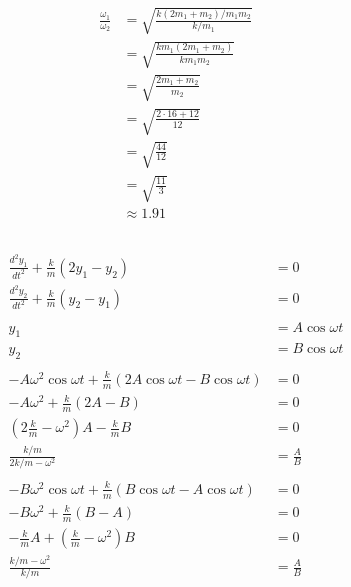 \documentclass{article}
\begin{document}
\begin{enumerate}
        \begin{align*}
          \frac{\omega_1}{\omega_2} & = \sqrt{\frac{k (2 m_1 + m_2) / m_1 m_2}{k / m_1}} \\
                                    & = \sqrt{\frac{k m_1 (2 m_1 + m_2)}{k m_1 m_2}}     \\
                                    & = \sqrt{\frac{2 m_1 + m_2}{m_2}}                   \\
                                    & = \sqrt{\frac{2 \cdot 16 + 12}{12}}                \\
                                    & = \sqrt{\frac{44}{12}}                             \\
                                    & = \sqrt{\frac{11}{3}}                              \\
                                    & \approx 1.91
        \end{align*}
\end{enumerate}

\subsection{}

\begin{align*}
  \frac{d^2 y_1}{d t^2} + \frac{k}{m} (2 y_1 - y_2)                             & = 0               \\
  \frac{d^2 y_2}{d t^2} + \frac{k}{m} (y_2 - y_1)                               & = 0               \\ \\
  y_1                                                                           & = A \cos \omega t \\
  y_2                                                                           & = B \cos \omega t \\ \\
  -A \omega^2 \cos \omega t + \frac{k}{m} (2 A \cos \omega t - B \cos \omega t) & = 0               \\
  -A \omega^2 + \frac{k}{m} (2 A - B)                                           & = 0               \\
  \left( 2 \frac{k}{m} - \omega^2 \right) A - \frac{k}{m} B                     & = 0               \\
  \frac{k / m}{2 k / m - \omega^2}                                              & = \frac{A}{B}     \\ \\
  -B \omega^2 \cos \omega t + \frac{k}{m} (B \cos \omega t - A \cos \omega t)   & = 0               \\
  -B \omega^2 + \frac{k}{m} (B - A)                                             & = 0               \\
  -\frac{k}{m} A + \left( \frac{k}{m} - \omega^2 \right) B                      & = 0               \\
  \frac{k / m - \omega^2}{k / m}                                                & = \frac{A}{B}
\end{align*}
\end{document}
